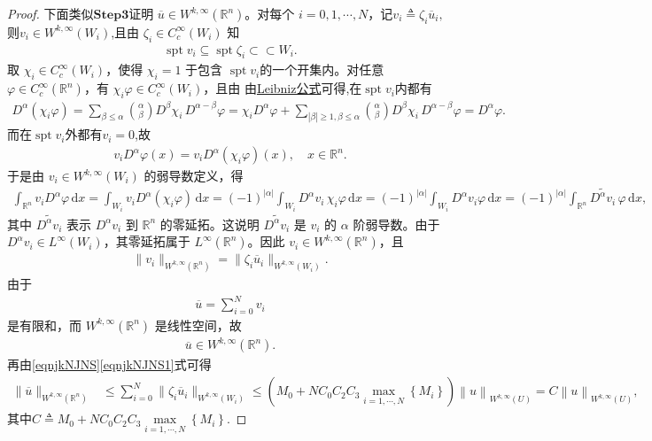 \documentclass[../../main.tex]{subfiles}
\begin{document}
\begin{proof}
下面类似$\mathbf{Step3}$证明 $\overline{u}\in W^{k,\infty}(\mathbb{R}^n)$。对每个 $i=0,1,\cdots,N$，记$v_i\triangleq\zeta_i\overline{u}_i,$则$v_i\in W^{k,\infty}(W_i)$,且由 $\zeta_i\in C_c^\infty(W_i)$ 知
\begin{align*}
\operatorname{spt}v_i\subseteq\operatorname{spt}\zeta_i\subset\subset W_i.
\end{align*}
取 $\chi_i\in C_c^\infty(W_i)$，使得 $\chi_i=1$ 于包含 $\operatorname{spt}v_i$的一个开集内。对任意 $\varphi\in C_c^\infty(\mathbb{R}^n)$，有 $\chi_i\varphi\in C_c^\infty(W_i)$，且由 由\hyperref[theorem:ch05-弱导数性质]{Leibniz公式}可得,在$\operatorname{spt}v_i$内都有
\begin{align*}
D^{\alpha}(\chi _i\varphi )=\sum_{\beta \leqslant \alpha}{\binom{\alpha}{\beta}D^{\beta}\chi _i\,D^{\alpha -\beta}\varphi}=\chi _iD^{\alpha}\varphi +\sum_{|\beta |\geqslant 1,\beta \leqslant \alpha}{\binom{\alpha}{\beta}D^{\beta}\chi _i\,D^{\alpha -\beta}\varphi}=D^{\alpha}\varphi .
\end{align*}
而在$\operatorname{spt}v_i$外都有$v_i=0$,故
\begin{align*}
v_iD^\alpha\varphi(x)=v_iD^\alpha(\chi_i\varphi)(x),\quad x\in \mathbb{R}^n.
\end{align*}
于是由 $v_i\in W^{k,\infty}(W_i)$ 的弱导数定义，得
\begin{align*}
\int_{\mathbb{R}^n}v_iD^\alpha\varphi\,\mathrm{d}x
=\int_{W_i}v_iD^\alpha(\chi_i\varphi)\,\mathrm{d}x=(-1)^{|\alpha|}\int_{W_i}D^\alpha v_i\,\chi_i\varphi\,\mathrm{d}x=(-1)^{|\alpha|}\int_{W_i}D^\alpha v_i\varphi\,\mathrm{d}x=(-1)^{|\alpha|}\int_{\mathbb{R}^n}\widetilde{D^\alpha v_i}\,\varphi\,\mathrm{d}x,
\end{align*}
其中 $\widetilde{D^\alpha v_i}$ 表示 $D^\alpha v_i$ 到 $\mathbb{R}^n$ 的零延拓。这说明 $\widetilde{D^\alpha v_i}$ 是 $v_i$ 的 $\alpha$ 阶弱导数。由于 $D^\alpha v_i\in L^\infty(W_i)$，其零延拓属于 $L^\infty(\mathbb{R}^n)$。因此 $v_i\in W^{k,\infty}(\mathbb{R}^n)$，且
\begin{align*}
\|v_i\|_{W^{k,\infty}(\mathbb{R}^n)}=\|\zeta_i\overline{u}_i\|_{W^{k,\infty}(W_i)}.
\end{align*}
由于
\begin{align*}
\overline{u}=\sum\limits_{i=0}^{N}v_i
\end{align*}
是有限和，而 $W^{k,\infty}(\mathbb{R}^n)$ 是线性空间，故
\begin{align*}
\overline{u}\in W^{k,\infty}(\mathbb{R}^n).
\end{align*}
再由\eqref{eqnjkNJNS}\eqref{eqnjkNJNS1}式可得
\begin{align}
\|\overline{u}\|_{W^{k,\infty}(\mathbb{R}^{n})}
&\leqslant\sum_{i=0}^{N}\|\zeta_i\overline{u}_i\|_{W^{k,\infty}(W_i)}
\leqslant \left( M_0+NC_0C_2C_3\underset{i=1,\cdots ,N}{\max}\left\{ M_i \right\} \right) \left\| u \right\| _{W^{k,\infty}\left( U \right)}=C\left\| u \right\| _{W^{k,\infty}\left( U \right)},\label{HJKNAJAAAA}
\end{align}
其中$C\triangleq M_0+NC_0C_2C_3\underset{i=1,\cdots ,N}{\max}\left\{ M_i \right\}$.


\end{proof}
\end{document}
